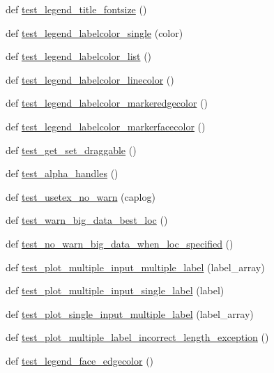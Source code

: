 \begin{DoxyCompactItemize}
\item 
def \hyperlink{namespacematplotlib_1_1tests_1_1test__legend_a54e126005104db477b9ddac5cd93c1a8}{test\+\_\+legend\+\_\+title\+\_\+fontsize} ()
\item 
def \hyperlink{namespacematplotlib_1_1tests_1_1test__legend_a0c3d5af91b798bca7e443645247c4244}{test\+\_\+legend\+\_\+labelcolor\+\_\+single} (color)
\item 
def \hyperlink{namespacematplotlib_1_1tests_1_1test__legend_a1fcc00c6048d5e19e36170c8ccd82bbc}{test\+\_\+legend\+\_\+labelcolor\+\_\+list} ()
\item 
def \hyperlink{namespacematplotlib_1_1tests_1_1test__legend_a79b4d8df2852ed030d69cf00bbe754e4}{test\+\_\+legend\+\_\+labelcolor\+\_\+linecolor} ()
\item 
def \hyperlink{namespacematplotlib_1_1tests_1_1test__legend_adc0789e3c418e67be993e60590ae48f8}{test\+\_\+legend\+\_\+labelcolor\+\_\+markeredgecolor} ()
\item 
def \hyperlink{namespacematplotlib_1_1tests_1_1test__legend_afff82e37dac24d724f2f6649f54fc63b}{test\+\_\+legend\+\_\+labelcolor\+\_\+markerfacecolor} ()
\item 
def \hyperlink{namespacematplotlib_1_1tests_1_1test__legend_a5fa571e74c638ae1bb3e2736485c2393}{test\+\_\+get\+\_\+set\+\_\+draggable} ()
\item 
def \hyperlink{namespacematplotlib_1_1tests_1_1test__legend_a0b13a750070bff1ac34513d1a468f0e8}{test\+\_\+alpha\+\_\+handles} ()
\item 
def \hyperlink{namespacematplotlib_1_1tests_1_1test__legend_ad9b32005c540a1faf39acfe1afac26be}{test\+\_\+usetex\+\_\+no\+\_\+warn} (caplog)
\item 
def \hyperlink{namespacematplotlib_1_1tests_1_1test__legend_a4bfcd140e6ce3a1d5c15064529a94f5a}{test\+\_\+warn\+\_\+big\+\_\+data\+\_\+best\+\_\+loc} ()
\item 
def \hyperlink{namespacematplotlib_1_1tests_1_1test__legend_a3b5b54fcd3c7994b45226a4c8404dafb}{test\+\_\+no\+\_\+warn\+\_\+big\+\_\+data\+\_\+when\+\_\+loc\+\_\+specified} ()
\item 
def \hyperlink{namespacematplotlib_1_1tests_1_1test__legend_ab8aa2c75ead70d1569ec2502b07a8001}{test\+\_\+plot\+\_\+multiple\+\_\+input\+\_\+multiple\+\_\+label} (label\+\_\+array)
\item 
def \hyperlink{namespacematplotlib_1_1tests_1_1test__legend_af449ec3f0ba09f1e7c833280794f4f9f}{test\+\_\+plot\+\_\+multiple\+\_\+input\+\_\+single\+\_\+label} (label)
\item 
def \hyperlink{namespacematplotlib_1_1tests_1_1test__legend_a203e940b0a274956a567a0add1fc78b9}{test\+\_\+plot\+\_\+single\+\_\+input\+\_\+multiple\+\_\+label} (label\+\_\+array)
\item 
def \hyperlink{namespacematplotlib_1_1tests_1_1test__legend_a9d309cad612c2197ed8e59c4d7147b7b}{test\+\_\+plot\+\_\+multiple\+\_\+label\+\_\+incorrect\+\_\+length\+\_\+exception} ()
\item 
def \hyperlink{namespacematplotlib_1_1tests_1_1test__legend_a35b055c9b3f1c7e0f661504ace02b46d}{test\+\_\+legend\+\_\+face\+\_\+edgecolor} ()
\end{DoxyCompactItemize}


